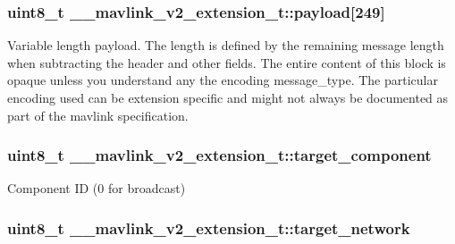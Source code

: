 \hypertarget{struct____mavlink__v2__extension__t_a1beba524f064a897185ff3c4b2e2abed}{
\subsubsection[{payload}]{\setlength{\rightskip}{0pt plus 5cm}uint8\+\_\+t \+\_\+\+\_\+mavlink\+\_\+v2\+\_\+extension\+\_\+t\+::payload\mbox{[}249\mbox{]}}}\label{struct____mavlink__v2__extension__t_a1beba524f064a897185ff3c4b2e2abed}


Variable length payload. The length is defined by the remaining message length when subtracting the header and other fields. The entire content of this block is opaque unless you understand any the encoding message\+\_\+type. The particular encoding used can be extension specific and might not always be documented as part of the mavlink specification. 

\hypertarget{struct____mavlink__v2__extension__t_a5640a5e8258b3237aa94cc39070df91c}{
\subsubsection[{target\+\_\+component}]{\setlength{\rightskip}{0pt plus 5cm}uint8\+\_\+t \+\_\+\+\_\+mavlink\+\_\+v2\+\_\+extension\+\_\+t\+::target\+\_\+component}}\label{struct____mavlink__v2__extension__t_a5640a5e8258b3237aa94cc39070df91c}


Component I\+D (0 for broadcast) 

\hypertarget{struct____mavlink__v2__extension__t_ac1707b863fecd59b2f464b16d3f16744}{
\subsubsection[{target\+\_\+network}]{\setlength{\rightskip}{0pt plus 5cm}uint8\+\_\+t \+\_\+\+\_\+mavlink\+\_\+v2\+\_\+extension\+\_\+t\+::target\+\_\+network}}\label{struct____mavlink__v2__extension__t_ac1707b863fecd59b2f464b16d3f16744}


